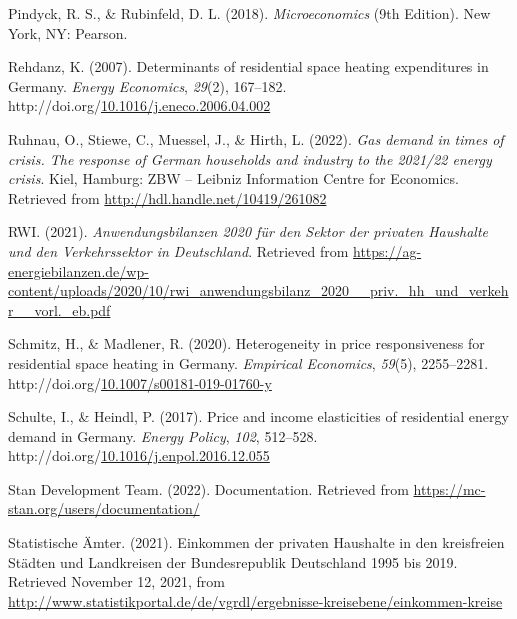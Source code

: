 \documentclass[12pt,twoside]{reedthesis}
\newlength{\cslhangindent}
\newenvironment{CSLReferences}[2] %
 {%
  \setlength{\parindent}{0pt}
  \ifodd #1 \everypar{\setlength{\hangindent}{\cslhangindent}}\ignorespaces\fi
  \ifnum #2 > 0
  \setlength{\parskip}{#2\baselineskip}
  \fi
 }%
 {}
\begin{document}
\begin{CSLReferences}{1}{0}
\leavevmode{}%
Pindyck, R. S., \& Rubinfeld, D. L. (2018). \emph{Microeconomics} (9th Edition). New York, NY: Pearson.

\leavevmode{}%
Rehdanz, K. (2007). Determinants of residential space heating expenditures in Germany. \emph{Energy Economics}, \emph{29}(2), 167--182. http://doi.org/\href{https://doi.org/10.1016/j.eneco.2006.04.002}{10.1016/j.eneco.2006.04.002}

\leavevmode{}%
Ruhnau, O., Stiewe, C., Muessel, J., \& Hirth, L. (2022). \emph{Gas demand in times of crisis. The response of German households and industry to the 2021/22 energy crisis}. Kiel, Hamburg: ZBW -- Leibniz Information Centre for Economics. Retrieved from \url{http://hdl.handle.net/10419/261082}

\leavevmode{}%
RWI. (2021). \emph{Anwendungsbilanzen 2020 für den Sektor der privaten Haushalte und den Verkehrssektor in Deutschland}. Retrieved from \url{https://ag-energiebilanzen.de/wp-content/uploads/2020/10/rwi_anwendungsbilanz_2020__priv._hh_und_verkehr__vorl._eb.pdf}

\leavevmode{}%
Schmitz, H., \& Madlener, R. (2020). Heterogeneity in price responsiveness for residential space heating in Germany. \emph{Empirical Economics}, \emph{59}(5), 2255--2281. http://doi.org/\href{https://doi.org/10.1007/s00181-019-01760-y}{10.1007/s00181-019-01760-y}

\leavevmode{}%
Schulte, I., \& Heindl, P. (2017). Price and income elasticities of residential energy demand in Germany. \emph{Energy Policy}, \emph{102}, 512--528. http://doi.org/\href{https://doi.org/10.1016/j.enpol.2016.12.055}{10.1016/j.enpol.2016.12.055}

\leavevmode{}%
Stan Development Team. (2022). Documentation. Retrieved from \url{https://mc-stan.org/users/documentation/}

\leavevmode{}%
Statistische Ämter. (2021). Einkommen der privaten Haushalte in den kreisfreien Städten und Landkreisen der Bundesrepublik Deutschland 1995 bis 2019. Retrieved November 12, 2021, from \url{http://www.statistikportal.de/de/vgrdl/ergebnisse-kreisebene/einkommen-kreise}


\end{CSLReferences}
\end{document}
